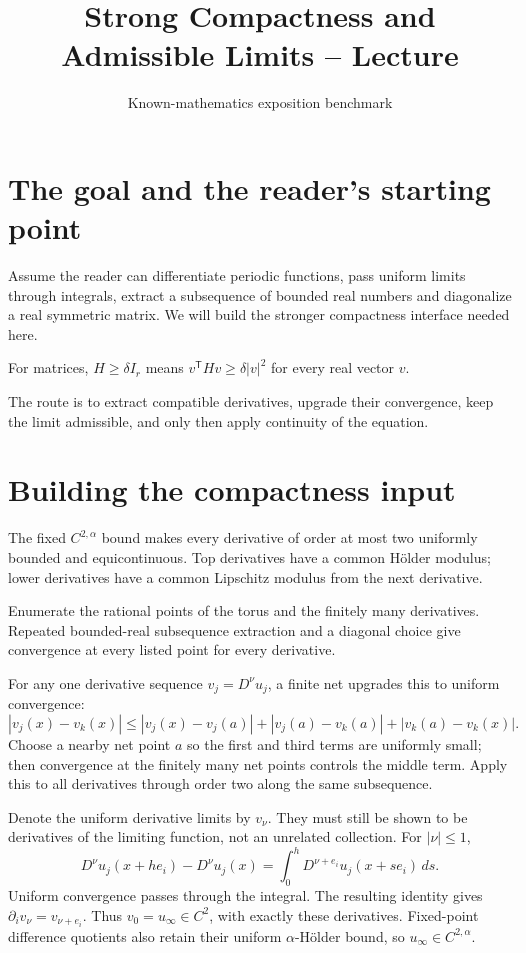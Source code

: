\documentclass[12pt,reqno]{amsart}
\title{Strong Compactness and Admissible Limits -- Lecture}
\author{Known-mathematics exposition benchmark}
\date{}
\begin{document}
\maketitle
\section{The goal and the reader's starting point}
Assume the reader can differentiate periodic functions, pass uniform limits
through integrals, extract a subsequence of bounded real numbers and diagonalize
a real symmetric matrix. We will build the stronger compactness interface needed here.



For matrices, $H\geq\delta I_r$ means $v^{\mathsf T}Hv\geq\delta|v|^2$
for every real vector $v$.
\begin{theorem}\label{thm:main}

\end{theorem}
The route is to extract compatible derivatives, upgrade their convergence,
keep the limit admissible, and only then apply continuity of the equation.

\section{Building the compactness input}
The fixed $C^{2,\alpha}$ bound makes every derivative of order at most two
uniformly bounded and equicontinuous. Top derivatives have a common H\"older modulus;
lower derivatives have a common Lipschitz modulus from the next derivative.

Enumerate the rational points of the torus and the finitely many derivatives.
Repeated bounded-real subsequence extraction and a diagonal choice give convergence
at every listed point for every derivative.

For any one derivative sequence $v_j=D^\nu u_j$, a finite net upgrades
this to uniform convergence:
\[
 |v_j(x)-v_k(x)|
 \leq |v_j(x)-v_j(a)|+|v_j(a)-v_k(a)|+|v_k(a)-v_k(x)|.
\]
Choose a nearby net point $a$ so the first and third terms are uniformly small;
then convergence at the finitely many net points controls the middle term.
Apply this to all derivatives through order two along the same subsequence.

Denote the uniform derivative limits by $v_\nu$. They must still be shown to
be derivatives of the limiting function, not an unrelated collection. For $|\nu|\leq1$,
\[
 D^\nu u_j(x+he_i)-D^\nu u_j(x)
 =\int_0^h D^{\nu+e_i}u_j(x+se_i)\,ds.
\]
Uniform convergence passes through the integral. The resulting identity gives
$\partial_i v_\nu=v_{\nu+e_i}$. Thus $v_0=u_\infty\in C^2$, with exactly
these derivatives. Fixed-point difference quotients also retain their uniform
$\alpha$-H\"older bound, so $u_\infty\in C^{2,\alpha}$.
\end{document}

